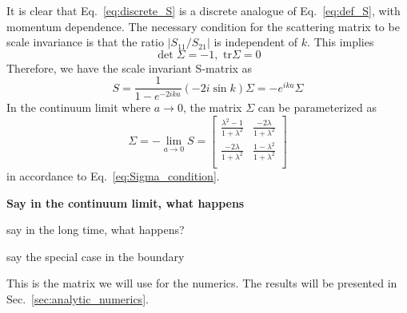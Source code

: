 It is clear that Eq.~\eqref{eq:discrete_S} is a discrete analogue of Eq.~\eqref{eq:def_S}, with momentum dependence. The necessary condition for the scattering matrix to be scale invariance is that the ratio $|S_{11}/S_{21}|$ is independent of $k$. This implies 
\begin{equation}
\label{eq:Sigma_condition}
\det \Sigma = -1, \, \, \text{tr} \Sigma = 0
\end{equation}
Therefore, we have the scale invariant S-matrix as
\begin{equation}
S = \frac{1}{1 - e^{-2ika } } ( -2i \sin k ) \Sigma
 = - e^{ika} \Sigma
\end{equation}
In the continuum limit where $a\rightarrow0$, the matrix $\Sigma$ can be parameterized as
\begin{equation}
\Sigma = -\lim_{a \rightarrow 0 } S = 
\begin{bmatrix}
\frac{\lambda^2- 1}{1 + \lambda^2} & \frac{-2\lambda }{1 + \lambda^2} \\
\frac{-2\lambda }{1 + \lambda^2} & \frac{1- \lambda^2}{1 + \lambda^2} \\
\end{bmatrix}
\end{equation}
in accordance to Eq.~\eqref{eq:Sigma_condition}. 

{\bf\color{red}
Say in the continuum limit, what happens

say in the long time, what happens? 

say the special case in the boundary
}

This is the matrix we will use for the numerics. The results will be presented in Sec.~\ref{sec:analytic_numerics}.
